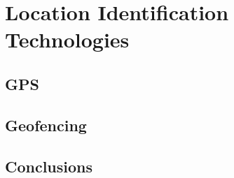 \section{Location Identification Technologies}

\subsection{GPS}

\subsection{Geofencing}

\subsection{Conclusions}